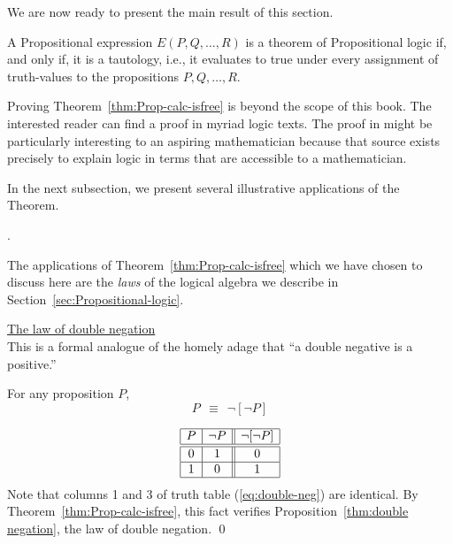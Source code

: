 We are now ready to present the main result of this section.

\begin{theorem}
\label{thm:Prop-calc-isfree}
A Propositional expression $E(P, Q, \ldots, R)$ is a theorem of
Propositional logic if, and only if, it is a tautology, i.e., it
evaluates to {\sc true} under every assignment of truth-values to the
propositions $P, Q, \ldots, R$.
\end{theorem}

Proving Theorem~\ref{thm:Prop-calc-isfree} is beyond the scope of this
book.  The interested reader can find a proof in myriad logic texts.
The proof in  \cite{Rosser53} might be particularly interesting to an
aspiring mathematician because that source exists precisely to explain
logic in terms that are accessible to a mathematician.

In the next subsection, we present several illustrative applications
of the Theorem.


\bigskip

.

The applications of Theorem~\ref{thm:Prop-calc-isfree} which we have
chosen to discuss here are the {\em laws} of the logical algebra we
describe in Section~\ref{sec:Propositional-logic}.

\bigskip

\noindent
\underline{\small\sf The law of double negation} \\
This is a formal analogue of the homely adage that ``a double negative
is a positive.''

\begin{prop}
\label{thm:double negation}
For any proposition $P$,
\[ P \ \ \equiv \ \ \neg [\neg P] \]
\end{prop}

\begin{equation}
\label{eq:double-neg}
\begin{array}{|c|c||c|}
\hline
P & \neg P & \neg[\neg P] \\
\hline
\hline
0 & 1 & 0 \\
\hline
1 & 0 & 1 \\
\hline
\end{array}
\end{equation}
Note that columns 1 and 3 of truth table (\ref{eq:double-neg}) are
identical.  By Theorem~\ref{thm:Prop-calc-isfree}, this fact verifies
Proposition~\ref{thm:double negation}, the law of double negation.
\qed

